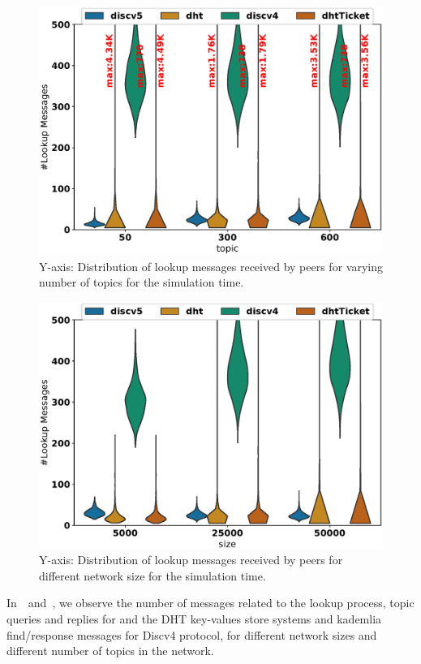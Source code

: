 \begin{figure}
\centering
\includegraphics[width=\linewidth]{results/efficiency/violin_topic_lookupMsgs.eps}
\caption{Y-axis: Distribution of lookup messages received by peers for varying number of topics for the simulation time.}
\label{fig:lookupMsgPerTopic}
\end{figure}

\begin{figure}[!h]
\centering
\includegraphics[width=\linewidth]{results/efficiency/violin_size_lookupMsgs.eps}
\caption{Y-axis: Distribution of lookup messages received by peers for different network size for the simulation time.}
\label{fig:lookupMsgPerSize}
\end{figure}

In~~and~, we observe the number of messages related to the lookup process, \ie topic queries and replies for \sysname and the DHT key-values store systems and kademlia find/response messages for Discv4 protocol,  for different network sizes and different number of topics in the network. 

